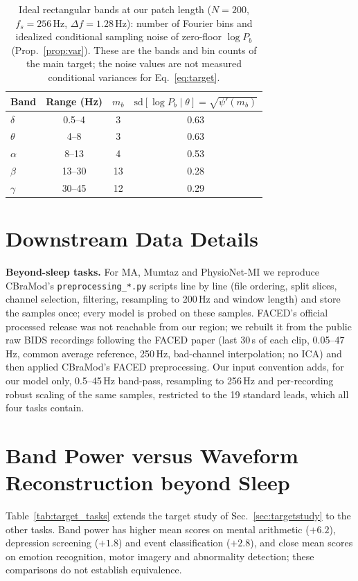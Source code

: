 \begin{table}[h]\centering\small
\caption{Ideal rectangular bands at our patch length ($N{=}200$, $f_s{=}256$\,Hz,
$\Delta f{=}1.28$\,Hz): number of Fourier bins and idealized conditional sampling noise of
zero-floor $\log P_b$ (Prop.~\ref{prop:var}). These are the bands and bin counts of the main
target; the noise values are not measured conditional variances for Eq.~\eqref{eq:target}.}
\label{tab:bins}
\setlength{\tabcolsep}{4pt}
\begin{tabular}{l c c c}
\toprule
Band & Range (Hz) & $m_b$ & $\mathrm{sd}[\log P_b\mid\theta]=\sqrt{\psi'(m_b)}$\\
\midrule
$\delta$ & 0.5--4 & 3 & 0.63\\
$\theta$ & 4--8 & 3 & 0.63\\
$\alpha$ & 8--13 & 4 & 0.53\\
$\beta$ & 13--30 & 13 & 0.28\\
$\gamma$ & 30--45 & 12 & 0.29\\
\bottomrule
\end{tabular}
\end{table}

\section{Downstream Data Details}\label{app:data}
\noindent\textbf{Beyond-sleep tasks.} For MA, Mumtaz and PhysioNet-MI we reproduce CBraMod's
\texttt{preprocessing\_*.py} scripts line by line (file ordering, split slices, channel
selection, filtering, resampling to 200\,Hz and window length) and store the samples once;
every model is probed on these samples. FACED's official processed release was not
reachable from our region; we rebuilt it from the public raw BIDS recordings following the
FACED paper (last 30\,s of each clip, 0.05--47\,Hz, common average reference, 250\,Hz,
bad-channel interpolation; no ICA) and then applied CBraMod's FACED preprocessing. Our input
convention adds, for our model only, 0.5--45\,Hz band-pass, resampling to 256\,Hz and
per-recording robust scaling of the same samples, restricted to the 19 standard leads, which
all four tasks contain.



\section{Band Power versus Waveform Reconstruction beyond Sleep}\label{app:targettasks}

Table~\ref{tab:target_tasks} extends the target study of Sec.~\ref{sec:targetstudy} to the other
tasks. Band power has higher mean scores on mental arithmetic ($+6.2$), depression screening
($+1.8$) and event classification ($+2.8$), and close mean scores on emotion recognition, motor
imagery and abnormality detection; these comparisons do not establish equivalence.

